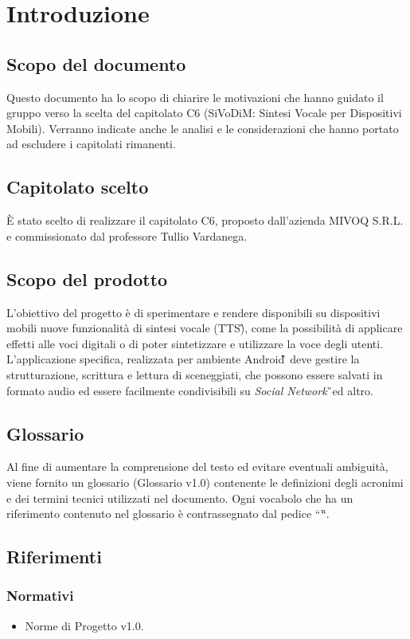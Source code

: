 \section{Introduzione}

\subsection{Scopo del documento}
Questo documento ha lo scopo di chiarire le motivazioni che hanno guidato il gruppo verso la scelta del capitolato C6 (SiVoDiM: Sintesi Vocale per Dispositivi Mobili). Verranno indicate anche le analisi e le considerazioni che hanno portato ad escludere i capitolati rimanenti.

\subsection{Capitolato scelto}
È stato scelto di realizzare il capitolato C6, proposto dall'azienda MIVOQ S.R.L. e commissionato dal professore Tullio Vardanega.

\subsection{Scopo del prodotto}
L'obiettivo del progetto è di sperimentare e rendere disponibili su dispositivi mobili nuove funzionalità di sintesi vocale (TTS\G), come la possibilità di applicare effetti alle voci digitali o di poter sintetizzare e utilizzare la voce degli utenti. L'applicazione specifica, realizzata per ambiente Android\G\, deve gestire la strutturazione, scrittura e lettura di sceneggiati, che possono essere salvati in formato audio ed essere facilmente condivisibili su \textit{Social Network}\G\ ed altro.

\subsection{Glossario}
Al fine di aumentare la comprensione del testo ed evitare eventuali ambiguità, viene fornito un glossario (Glossario v1.0) contenente le definizioni degli acronimi e dei termini tecnici utilizzati nel documento. Ogni vocabolo che ha un riferimento contenuto nel glossario è contrassegnato dal pedice “\G “.

\subsection{Riferimenti}

\subsubsection{Normativi}
\begin{itemize}
\item Norme di Progetto v1.0.
\end{itemize}

